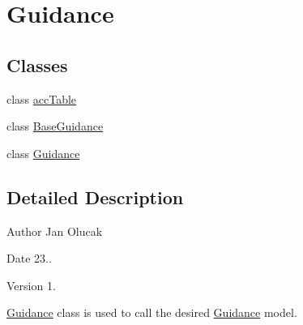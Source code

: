 \hypertarget{group___guidance}{}\section{Guidance}
\label{group___guidance}
\subsection*{Classes}
\begin{DoxyCompactItemize}
\item 
class \hyperlink{classacc_table}{acc\+Table}
\item 
class \hyperlink{class_base_guidance}{Base\+Guidance}
\item 
class \hyperlink{class_guidance}{Guidance}
\end{DoxyCompactItemize}


\subsection{Detailed Description}
\begin{DoxyAuthor}{Author}
Jan Olucak 
\end{DoxyAuthor}
\begin{DoxyDate}{Date}
23.. 
\end{DoxyDate}
\begin{DoxyVersion}{Version}
1.
\end{DoxyVersion}
\hyperlink{class_guidance}{Guidance} class is used to call the desired \hyperlink{class_guidance}{Guidance} model. 